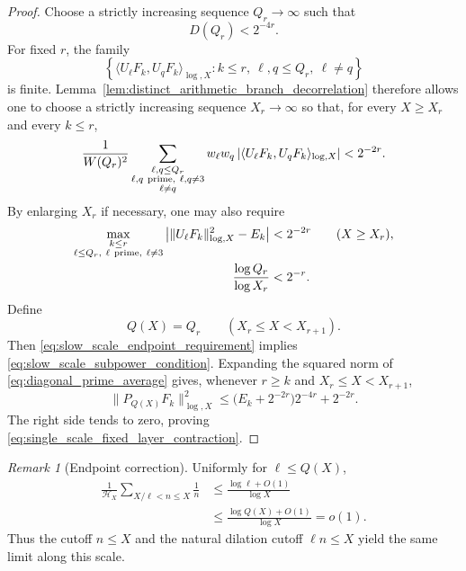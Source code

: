 \documentclass[11pt]{amsart}
\numberwithin{equation}{section}
\theoremstyle{plain}
\theoremstyle{definition}
\theoremstyle{remark}
\newtheorem{remark}[theorem]{Remark}
\begin{document}
\begin{proof}
Choose a strictly increasing sequence $Q_r\to\infty$ such that
\begin{equation}
D(Q_r)<2^{-4r}.
\label{eq:slow_scale_Qr_choice}
\end{equation}
For fixed $r$, the family
\begin{equation}
\left\{
\langle U_\ell F_k,U_qF_k\rangle_{\log,X}:
k\leq r,
\ \ell,q\leq Q_r,
\ \ell\neq q
\right\}
\label{eq:finite_family_for_diagonalization}
\end{equation}
is finite.  Lemma~\ref{lem:distinct_arithmetic_branch_decorrelation} therefore allows one to choose a strictly increasing sequence $X_r\to\infty$ so that, for every $X\geq X_r$ and every $k\leq r$,
\begin{equation}
\frac1{W(Q_r)^2}
\sum_{\substack{\ell,q\leq Q_r\\
\ell,q\ {\rm prime},\ \ell,q\neq3\\
\ell\neq q}}
w_\ell w_q
\left|
\langle U_\ell F_k,U_qF_k\rangle_{\log,X}
\right|
<2^{-2r}.
\label{eq:weighted_finite_off_diagonal_bound}
\end{equation}
By enlarging $X_r$ if necessary, one may also require
\begin{align}
\max_{\substack{k\leq r\\
\ell\leq Q_r,\ \ell\ {\rm prime},\ \ell\neq3}}
\left|
\|U_\ell F_k\|_{\log,X}^2-E_k
\right|
&<2^{-2r}
\qquad(X\geq X_r),
\label{eq:weighted_finite_diagonal_bound}
\\
\frac{\log Q_r}{\log X_r}
&<2^{-r}.
\label{eq:slow_scale_endpoint_requirement}
\end{align}
Define
\begin{equation}
Q(X)=Q_r
\qquad(X_r\leq X<X_{r+1}).
\label{eq:slow_step_scale_definition}
\end{equation}
Then \eqref{eq:slow_scale_endpoint_requirement} implies \eqref{eq:slow_scale_subpower_condition}.  Expanding the squared norm of \eqref{eq:diagonal_prime_average} gives, whenever $r\geq k$ and $X_r\leq X<X_{r+1}$,
\begin{equation}
\|P_{Q(X)}F_k\|_{\log,X}^2
\leq
\bigl(E_k+2^{-2r}\bigr)2^{-4r}+2^{-2r}.
\label{eq:single_scale_fixed_layer_bound}
\end{equation}
The right side tends to zero, proving \eqref{eq:single_scale_fixed_layer_contraction}.
\end{proof}

\begin{remark}[Endpoint correction]
\label{rem:slow_scale_endpoint_correction}
Uniformly for $\ell\leq Q(X)$,
\begin{align}
\frac1{\mathcal H_X}
\sum_{X/\ell<n\leq X}\frac1n
&\leq
\frac{\log\ell+O(1)}{\log X}
\label{eq:slow_scale_endpoint_first}
\\
&\leq
\frac{\log Q(X)+O(1)}{\log X}
=o(1).
\label{eq:slow_scale_endpoint_second}
\end{align}
Thus the cutoff $n\leq X$ and the natural dilation cutoff $\ell n\leq X$ yield the same limit along this scale.
\end{remark}
\end{document}
